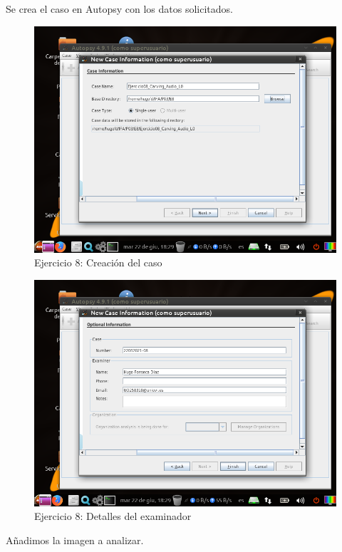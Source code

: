 \documentclass[11pt]{article}
\begin{document}
Se crea el caso en Autopsy con los datos solicitados.

\begin{figure}[H]
    \caption{Ejercicio 8: Creación del caso}
    \centering
    \includegraphics[scale=0.7]{p03/e8-1.png}
\end{figure}

\begin{figure}[H]
    \caption{Ejercicio 8: Detalles del examinador}
    \centering
    \includegraphics[scale=0.7]{p03/e8-2.png}
\end{figure}

Añadimos la imagen a analizar.
\end{document}
